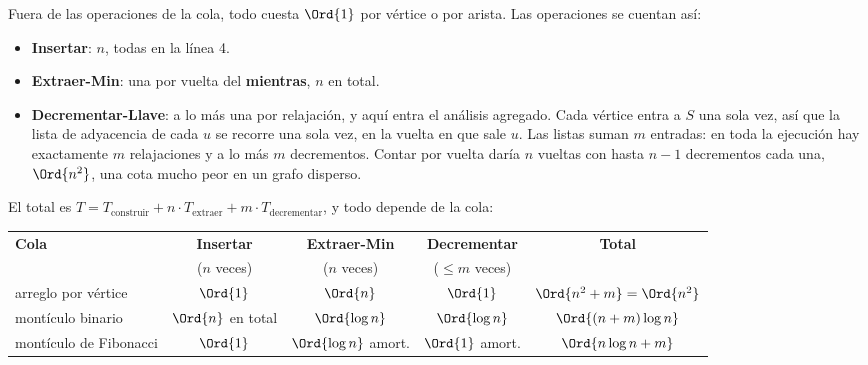 \documentclass[11pt,letterpaper]{article}
\begin{document}
Fuera de las operaciones de la cola, todo cuesta $\Ord{1}$ por vértice
o por arista. Las operaciones se cuentan así:
\begin{itemize}[itemsep=0.1em]
  \item \textbf{Insertar}: $n$, todas en la línea 4.
  \item \textbf{Extraer-Min}: una por vuelta del \textbf{mientras},
        $n$ en total.
  \item \textbf{Decrementar-Llave}: a lo más una por relajación, y
        aquí entra el análisis agregado. Cada vértice entra a $S$ una
        sola vez, así que la lista de adyacencia de cada $u$ se
        recorre una sola vez, en la vuelta en que sale $u$. Las listas
        suman $m$ entradas: en toda la ejecución hay exactamente $m$
        relajaciones y a lo más $m$ decrementos. Contar por vuelta
        daría $n$ vueltas con hasta $n - 1$ decrementos cada una,
        $\Ord{n^2}$, una cota mucho peor en un grafo disperso.
\end{itemize}
El total es
$T = T_{\text{construir}} + n \cdot T_{\text{extraer}}
+ m \cdot T_{\text{decrementar}}$, y todo depende de la cola:
\begin{center}
\small
\begin{tabular}{lcccc}
  \toprule
  \textbf{Cola} & \textbf{Insertar} & \textbf{Extraer-Min}
    & \textbf{Decrementar} & \textbf{Total} \\
  & ($n$ veces) & ($n$ veces) & ($\le m$ veces) & \\
  \midrule
  arreglo por vértice & $\Ord{1}$ & $\Ord{n}$ & $\Ord{1}$
    & $\Ord{n^2 + m} = \Ord{n^2}$ \\
  montículo binario & $\Ord{n}$ en total & $\Ord{\log n}$
    & $\Ord{\log n}$ & $\Ord{(n + m) \log n}$ \\
  montículo de Fibonacci & $\Ord{1}$ & $\Ord{\log n}$ amort.
    & $\Ord{1}$ amort. & $\Ord{n \log n + m}$ \\
  \bottomrule
\end{tabular}
\end{center}
\end{document}
